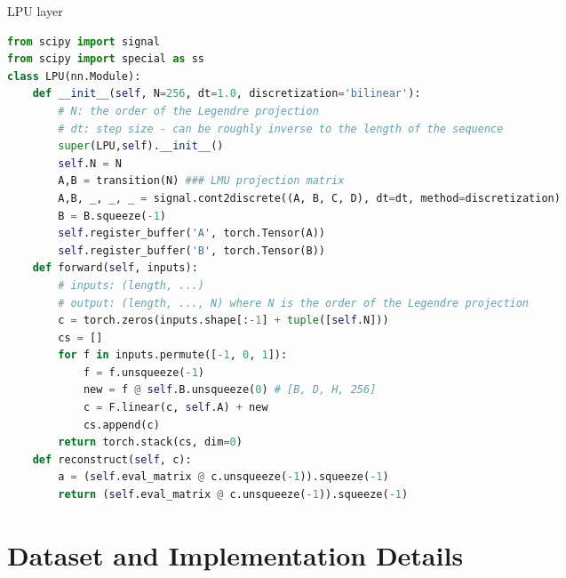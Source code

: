 \documentclass{article}
\begin{document}
\begin{algorithm}[h]
	\caption{LPU layer}
	\label{alg:code1}
    
    \begin{lstlisting}[language=python]
from scipy import signal
from scipy import special as ss
class LPU(nn.Module):
    def __init__(self, N=256, dt=1.0, discretization='bilinear'):
        # N: the order of the Legendre projection 
        # dt: step size - can be roughly inverse to the length of the sequence
        super(LPU,self).__init__()
        self.N = N
        A,B = transition(N) ### LMU projection matrix
        A,B, _, _, _ = signal.cont2discrete((A, B, C, D), dt=dt, method=discretization) 
        B = B.squeeze(-1)
        self.register_buffer('A', torch.Tensor(A)) 
        self.register_buffer('B', torch.Tensor(B)) 
    def forward(self, inputs):  
        # inputs: (length, ...) 
        # output: (length, ..., N) where N is the order of the Legendre projection
        c = torch.zeros(inputs.shape[:-1] + tuple([self.N]))
        cs = []
        for f in inputs.permute([-1, 0, 1]):
            f = f.unsqueeze(-1)
            new = f @ self.B.unsqueeze(0) # [B, D, H, 256]
            c = F.linear(c, self.A) + new
            cs.append(c)
        return torch.stack(cs, dim=0)
    def reconstruct(self, c):
        a = (self.eval_matrix @ c.unsqueeze(-1)).squeeze(-1)
        return (self.eval_matrix @ c.unsqueeze(-1)).squeeze(-1)
    \end{lstlisting}
    
\end{algorithm}
%
  \section{Dataset and Implementation Details}
\label{app:section_dataset_implem}
\end{document}
